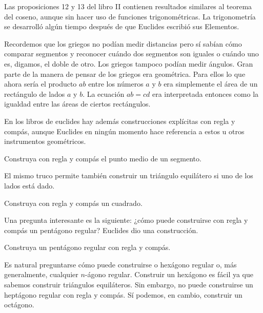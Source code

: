 Las proposiciones 12 y 13 del libro II contienen resultados similares al
teorema del coseno, aunque sin hacer uso de funciones trigonométricas. La
trigonometría se desarrolló algún tiempo después de que Euclides escribió sus
Elementos. 

%
%

Recordemos que los griegos no podían medir distancias pero sí sabían cómo
comparar segmentos y reconocer cuándo dos segmentos son iguales o cuándo uno
es, digamos, el doble de otro. Los griegos tampoco podían medir ángulos. Gran
parte de la manera de pensar de los griegos era geométrica. Para ellos lo que
ahora sería el producto $ab$ entre los números $a$ y $b$ era simplemente el
área de un rectángulo de lados $a$ y $b$. La ecuación $ab=cd$ era interpretada
entonces como la igualdad entre las áreas de ciertos rectángulos.

En los libros de euclides hay además construcciones explícitas con regla y
compás, aunque Euclides en ningún momento hace referencia a estos u otros
instrumentos geométricos. 

\begin{exercise}
	Construya con regla y compás el punto medio de un segmento.
\end{exercise}

El mismo truco permite también construir un triángulo equilátero si uno de los
lados está dado.

\begin{exercise}
	Construya con regla y compás un cuadrado.	
\end{exercise}

Una pregunta interesante es la siguiente: ¿cómo puede construirse con regla y
compás un pentágono regular? Euclides dio una construcción.

\begin{exercise}
	Construya un pentágono regular con regla y compás. 
\end{exercise}

Es natural preguntarse cómo puede construirse o hexágono regular o, más
generalmente, cualquier $n$-ágono regular. Construir un hexágono es fácil ya
que sabemos construir triángulos equiláteros. Sin embargo, no puede construirse
un heptágono regular con regla y compás. Sí podemos, en cambio, construir un
octágono. 

